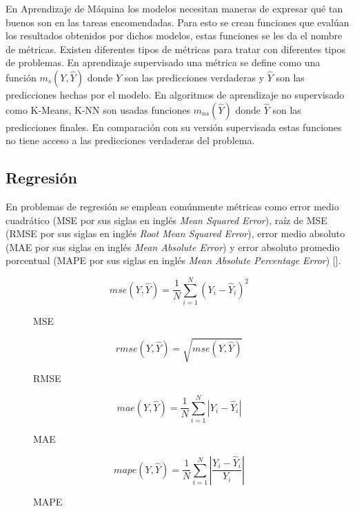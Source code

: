 En Aprendizaje de Máquina los modelos necesitan maneras de expresar qué tan buenos son 
en las tareas encomendadas. Para esto se crean funciones que evalúan los resultados obtenidos
por dichos modelos, estas funciones se les da el nombre de métricas. Existen diferentes tipos de
métricas para tratar con diferentes tipos de problemas. En aprendizaje supervisado una métrica se
define como una función $m_s(Y, \hat{Y})$ donde $Y$ son las predicciones verdaderas y $\hat{Y}$ son las predicciones
hechas por el modelo. En algoritmos de aprendizaje no supervisado como K-Means, K-NN son usadas funciones $m_{ns}(\hat{Y})$
donde $\hat{Y}$ son las predicciones finales. En comparación con su versión supervisada estas funciones no tiene acceso
a las predicciones verdaderas del problema.

\subsection{Regresión}

En problemas de regresión se emplean comúnmente
métricas como error medio cuadrático (MSE por sus siglas en inglés \emph{Mean Squared Error}), 
raíz de MSE (RMSE por sus siglas en inglés \emph{Root Mean Squared Error}),
error medio absoluto (MAE por sus siglas en inglés \emph{Mean Absolute Error}) y error absoluto promedio porcentual 
(MAPE por sus siglas en inglés \emph{Mean Absolute Percentage Error}) [\cite{botchkarev2019new}].

\begin{figure}
	\begin{equation}\label{metric:MSE}
		mse(Y, \hat{Y}) = \frac{1}{N} \sum^{N}_{i=1} (Y_i - \hat{Y}_i)^2
	\end{equation}
	\caption{MSE}
\end{figure}

\begin{figure}
	\begin{equation}\label{metric:RMSE}
		rmse(Y, \hat{Y}) = \sqrt{mse(Y, \hat{Y})}
	\end{equation}
	\caption{RMSE}
\end{figure}

\begin{figure}
	\begin{equation}\label{metric:MAE}
		mae(Y, \hat{Y}) = \frac{1}{N} \sum^{N}_{i=1} |Y_i - \hat{Y}_i|
	\end{equation}
	\caption{MAE}
\end{figure}

\begin{figure}
	\begin{equation}\label{metric:MAPE}
		mape(Y, \hat{Y}) = \frac{1}{N} \sum^{N}_{i=1} |\frac{Y_i - \hat{Y}_i}{Y_i}|
	\end{equation}
	\caption{MAPE}
\end{figure}

